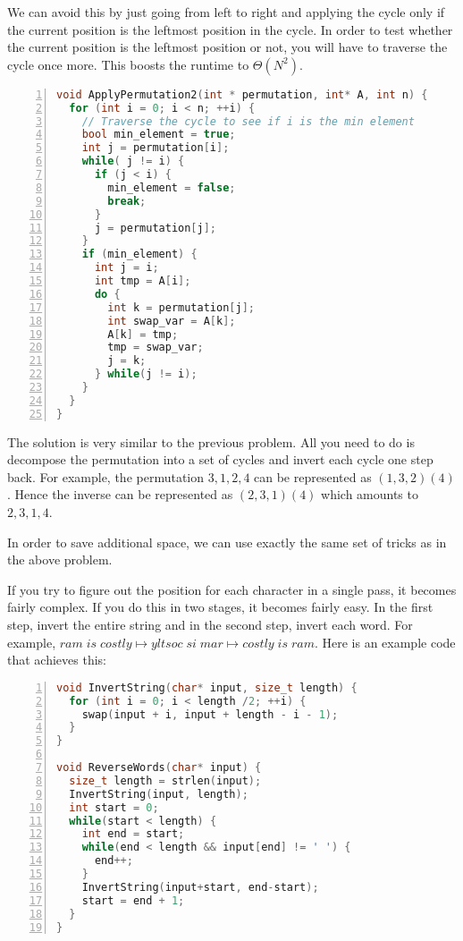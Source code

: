 We can avoid this by just going from
left to right and applying the cycle only if the current position is the leftmost position in 
the cycle. In order to test whether the current
position is the leftmost position or not, you will have to traverse the
cycle once more. This boosts the runtime to $\Theta(N^2)$.
\begin{lstlisting}[basicstyle=\footnotesize,numbers=left,breaklines=true,language=C++]
void ApplyPermutation2(int * permutation, int* A, int n) {
  for (int i = 0; i < n; ++i) {
    // Traverse the cycle to see if i is the min element
    bool min_element = true;
    int j = permutation[i];
    while( j != i) {
      if (j < i) {
        min_element = false;
        break;
      }
      j = permutation[j];
    }
    if (min_element) {
      int j = i;
      int tmp = A[i];
      do {
        int k = permutation[j];
        int swap_var = A[k];
        A[k] = tmp;
        tmp = swap_var;
        j = k;
      } while(j != i);
    }
  }
}
\end{lstlisting}

The solution is very similar to the previous problem. All you need to
do is decompose the permutation into a set of cycles and invert each
cycle one step back. For example, the permutation  $3,1,2,4$ can be
represented as $(1,3,2)(4)$.
Hence the inverse can be represented as $(2,3,1)(4)$ which amounts to
$2,3,1,4$.

In order to save additional space, we can use exactly the same set of
tricks as in the above problem.

If you try to figure out the position for each character in a single
pass, it becomes fairly complex. If you do this in two stages, it
becomes fairly easy. In the first step, invert the entire string and in
the second step, invert each word. For example, $ram\; is\; costly \mapsto
yltsoc\; si\; mar \mapsto costly\; is\; ram$. Here is an example code that achieves
this:
\begin{lstlisting}[basicstyle=\footnotesize,numbers=left,breaklines=true,language=C++]
void InvertString(char* input, size_t length) {
  for (int i = 0; i < length /2; ++i) {
    swap(input + i, input + length - i - 1);
  }
}

void ReverseWords(char* input) {
  size_t length = strlen(input);
  InvertString(input, length);
  int start = 0;
  while(start < length) {
    int end = start;
    while(end < length && input[end] != ' ') {
      end++;
    }
    InvertString(input+start, end-start);
    start = end + 1;
  }
}
 \end{lstlisting}


